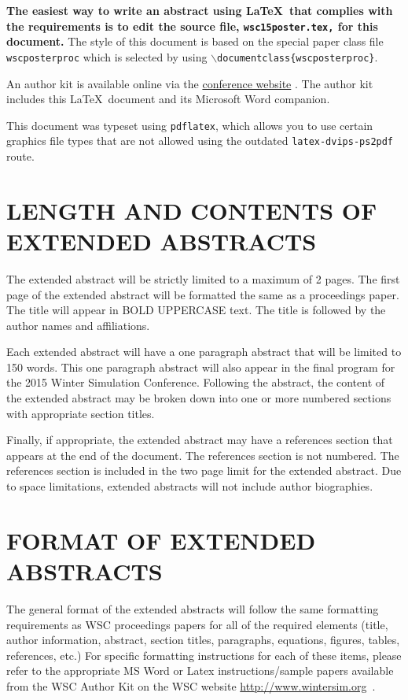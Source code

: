 \documentclass{wscposterproc}
\begin{document}
\textbf{The easiest way to write an abstract using \LaTeX\ that complies with the
requirements is to edit the source file, {\tt wsc15poster.tex,} for this document.}
The style of this document is based on the special paper class file {\tt wscposterproc} which is selected by using {\tt $\backslash$documentclass\{wscposterproc\}}.

An author kit is available online via the  \href{http://www.wintersim.org}%
{conference website} \cite{WSC}.
The author kit includes this \LaTeX\ document and its Microsoft Word companion.

This document was typeset using {\tt pdflatex}, which allows you to use certain
graphics file types that are not allowed using the outdated {\tt latex-dvips-ps2pdf} route.

\section{LENGTH AND CONTENTS OF EXTENDED ABSTRACTS}
The extended abstract will be strictly limited to a maximum  of 2 pages. The first page of the extended abstract will be formatted the same as a proceedings paper. The title will appear in BOLD UPPERCASE text. The title is followed by the author names and affiliations.

Each extended abstract will have a one paragraph abstract that will be limited to 150 words. This one paragraph abstract will also appear in the final program for the 2015 Winter Simulation Conference. Following the abstract, the content of the extended abstract may be broken down into one or more numbered sections with appropriate section titles.

Finally, if appropriate, the extended abstract may have a references section that appears at the end of the document. The references section is not numbered. The references section is included in the two page limit for the extended abstract. Due to space limitations, extended abstracts will not include author biographies.

\section{FORMAT OF EXTENDED ABSTRACTS}

The general format of the extended abstracts will follow the same formatting requirements as WSC proceedings papers for all of the required elements (title, author information, abstract, section titles, paragraphs, equations, figures, tables, references, etc.) For specific formatting instructions for each of these items, please refer to the appropriate MS Word or Latex instructions/sample papers available from the WSC Author Kit on the WSC website \url{http://www.wintersim.org}~\cite{WSC}.
\end{document}
